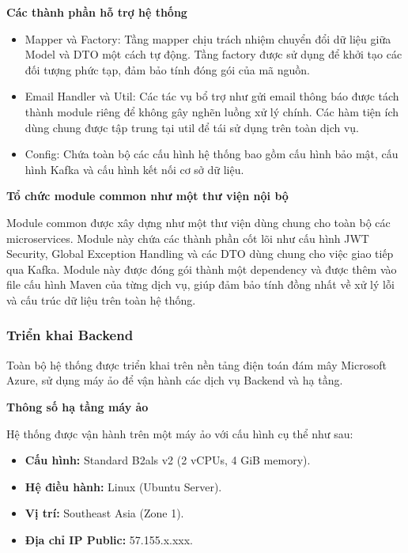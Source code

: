 \textbf{Các thành phần hỗ trợ hệ thống}

\begin{itemize}
    \item Mapper và Factory: Tầng mapper chịu trách nhiệm chuyển đổi dữ liệu giữa Model và DTO một cách tự động. Tầng factory được sử dụng để khởi tạo các đối tượng phức tạp, đảm bảo tính đóng gói của mã nguồn.
    \item Email Handler và Util: Các tác vụ bổ trợ như gửi email thông báo được tách thành module riêng để không gây nghẽn luồng xử lý chính. Các hàm tiện ích dùng chung được tập trung tại util để tái sử dụng trên toàn dịch vụ.
    \item Config: Chứa toàn bộ các cấu hình hệ thống bao gồm cấu hình bảo mật, cấu hình Kafka và cấu hình kết nối cơ sở dữ liệu.
\end{itemize}

\textbf{Tổ chức module common như một thư viện nội bộ}

Module common được xây dựng như một thư viện dùng chung cho toàn bộ các microservices. Module này chứa các thành phần cốt lõi như cấu hình JWT Security, Global Exception Handling và các DTO dùng chung cho việc giao tiếp qua Kafka. Module này được đóng gói thành một dependency và được thêm vào file cấu hình Maven của từng dịch vụ, giúp đảm bảo tính đồng nhất về xử lý lỗi và cấu trúc dữ liệu trên toàn hệ thống.

\subsubsection{Triển khai Backend}

Toàn bộ hệ thống được triển khai trên nền tảng điện toán đám mây Microsoft Azure, sử dụng máy ảo để vận hành các dịch vụ Backend và hạ tầng.

\textbf{Thông số hạ tầng máy ảo}

Hệ thống được vận hành trên một máy ảo với cấu hình cụ thể như sau:

\begin{itemize}
    \item \textbf{Cấu hình:} Standard B2als v2 (2 vCPUs, 4 GiB memory).
    \item \textbf{Hệ điều hành:} Linux (Ubuntu Server).
    \item \textbf{Vị trí:} Southeast Asia (Zone 1).
    \item \textbf{Địa chỉ IP Public:} 57.155.x.xxx.
\end{itemize}

